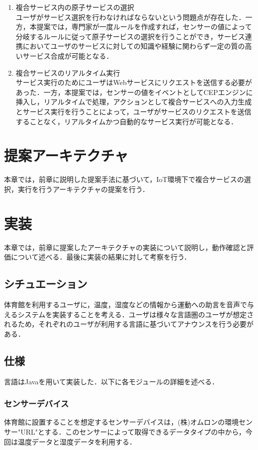 \documentclass{kuisthesis}			%
\begin{document}
\begin{enumerate}
\item 複合サービス内の原子サービスの選択\\
ユーザがサービス選択を行わなければならないという問題点が存在した．一方，本提案では，専門家が一度ルールを作成すれば，センサーの値によって分岐するルールに従って原子サービスの選択を行うことができ，サービス連携においてユーザのサービスに対しての知識や経験に関わらず一定の質の高いサービス合成が可能となる．
\item 複合サービスのリアルタイム実行\\
サービス実行のためにユーザはWebサービスにリクエストを送信する必要があった．一方，本提案では，センサーの値をイベントとしてCEPエンジンに挿入し，リアルタイムで処理，アクションとして複合サービスへの入力生成とサービス実行を行うことによって，ユーザがサービスのリクエストを送信することなく，リアルタイムかつ自動的なサービス実行が可能となる．
\end{enumerate}

\section{提案アーキテクチャ}
本章では，前章に説明した提案手法に基づいて，IoT環境下で複合サービスの選択，実行を行うアーキテクチャの提案を行う．

\subsection{}

\section{実装}
本章では，前章に提案したアーキテクチャの実装について説明し，動作確認と評価について述べる．最後に実装の結果に対して考察を行う．
\subsection{シチュエーション}
体育館を利用するユーザに，温度，湿度などの情報から運動への助言を音声で与えるシステムを実装することを考える．ユーザは様々な言語圏のユーザが想定されるため，それぞれのユーザが利用する言語に基づいてアナウンスを行う必要がある．

\subsection{仕様}
言語はJavaを用いて実装した．以下に各モジュールの詳細を述べる．
\subsubsection{センサーデバイス}
体育館に設置することを想定するセンサーデバイスは，(株)オムロンの環境センサー"URL"とする．このセンサーによって取得できるデータタイプの中から，今回は温度データと湿度データを利用する．
\end{document}
